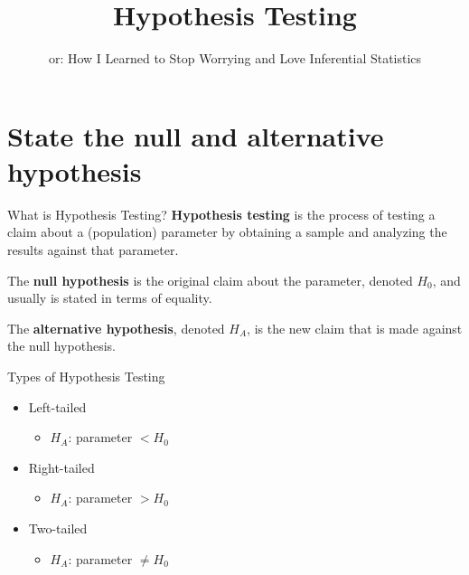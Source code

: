 \documentclass[t]{beamer}
\title{Hypothesis Testing}
\subtitle{or: How I Learned to Stop Worrying and Love Inferential Statistics}
\author{}
\date{}
\begin{document}

\begin{frame} 
\maketitle
\end{frame}

\section{State the null and alternative hypothesis}

\begin{frame}{What is Hypothesis Testing?}
\textbf{Hypothesis testing} is the process of testing a claim about a (population) parameter by obtaining a sample and analyzing the results against that parameter.	\newline\\	\pause

\begin{tcolorbox}[colframe=green!20!black, colback = green!30!white,title=\textbf{Null Hypothesis}]
The \textbf{null hypothesis} is the original claim about the parameter, denoted $H_0$, and usually is stated in terms of equality.
\end{tcolorbox}
\bigskip	\pause

\begin{tcolorbox}[colframe=green!20!black, colback = green!30!white,title=\textbf{Alternative Hypothesis}]
The \textbf{alternative hypothesis}, denoted $H_A$, is the new claim that is made against the null hypothesis.
\end{tcolorbox}
\end{frame}

\begin{frame}{Types of Hypothesis Testing}
\begin{itemize}
	\item Left-tailed
	\begin{itemize}
		\item<2->{$H_A$: parameter $ < H_0$}
\end{itemize}	\bigskip
	\item<3-> Right-tailed
	\begin{itemize}
		\item<4->{$H_A$: parameter $ > H_0$}
	\end{itemize}	\bigskip
	\item<5-> Two-tailed
	\begin{itemize}
		\item<6->{$H_A$: parameter $\neq H_0$}
	\end{itemize}
\end{itemize}
\end{frame}
\end{document}
